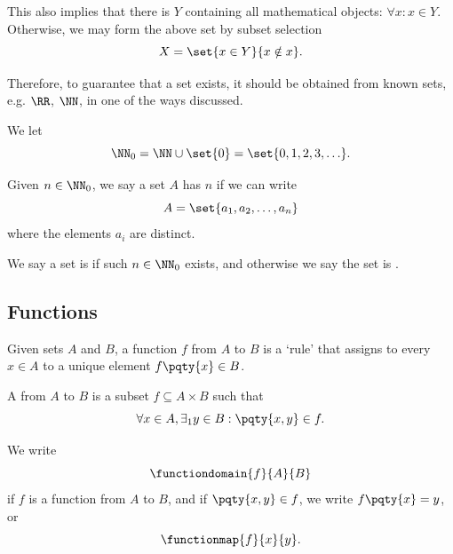 This also implies that there is  \(Y\) containing all mathematical objects: \(\forall x: x \in Y\). Otherwise, we may form the above set by subset selection
\[
    X = \set{x \in Y}{x \notin x}.
\]

Therefore, to guarantee that a set exists, it should be obtained from known sets, e.g. \(\RR\), \(\NN\), in one of the ways discussed.

\begin{definition}
    We let
    \[
        \NN_0 = \NN \cup \set{0} = \set{0, 1, 2, 3, \ldots}.
    \]

    Given \(n \in \NN_0\), we say a set \(A\) has  \(n\) if we can write
    \[
        A = \set{a_1, a_2, \ldots, a_n}
    \]
    where the elements \(a_i\) are distinct.

    We say a set is  if such \(n \in \NN_0\) exists, and otherwise we say the set is .
\end{definition}

\subsection{Functions}
\label{sec:functions}

Given sets \(A\) and \(B\), a function \(f\) from \(A\) to \(B\) is a `rule' that assigns to every \(x \in A\) to a unique element \(f\pqty{x} \in B\).

\begin{definition}[Function]
    A  from \(A\) to \(B\) is a subset \(f \subseteq A \times B\) such that
    \[
        \forall x \in A, \exists_1 y \in B: \pqty{x, y} \in f.
    \]

    We write
    \[
        \functiondomain{f}{A}{B}
    \]
    if \(f\) is a function from \(A\) to \(B\), and if \(\pqty{x, y} \in f\), we write \(f\pqty{x} = y\), or
    \[
        \functionmap{f}{x}{y}.
    \]
\end{definition}

